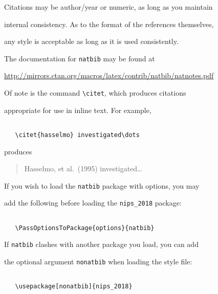 \documentclass{article}
\begin{document}
Citations may be author/year or numeric, as long as you maintain

internal consistency.  As to the format of the references themselves,

any style is acceptable as long as it is used consistently.



The documentation for \verb+natbib+ may be found at

\begin{center}

  \url{http://mirrors.ctan.org/macros/latex/contrib/natbib/natnotes.pdf}

\end{center}

Of note is the command \verb+\citet+, which produces citations

appropriate for use in inline text.  For example,

\begin{verbatim}

   \citet{hasselmo} investigated\dots

\end{verbatim}

produces

\begin{quote}

  Hasselmo, et al.\ (1995) investigated\dots

\end{quote}



If you wish to load the \verb+natbib+ package with options, you may

add the following before loading the \verb+nips_2018+ package:

\begin{verbatim}

   \PassOptionsToPackage{options}{natbib}

\end{verbatim}



If \verb+natbib+ clashes with another package you load, you can add

the optional argument \verb+nonatbib+ when loading the style file:

\begin{verbatim}

   \usepackage[nonatbib]{nips_2018}

\end{verbatim}
\end{document}
